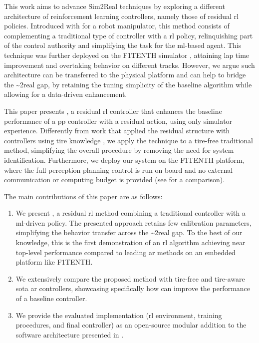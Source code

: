 \documentclass[letterpaper, conference]{IEEEtran}
\begin{document}
This work aims to advance Sim2Real techniques by exploring a different architecture of reinforcement learning controllers, namely those of residual \gls{rl} policies. Introduced with \cite{joahnnink2019residual} for a robot manipulator, this method consists of complementing a traditional type of controller with a \gls{rl} policy, relinquishing part of the control authority and simplifying the task for the \gls{ml}-based agent. This technique was further deployed on the F1TENTH simulator  \cite{trumpp2023residual, trumpp2024racemop}, attaining lap time improvement and overtaking behavior on different tracks.
However, we argue such architecture can be transferred to the physical platform and can help to bridge the \sim2real gap, by retaining the tuning simplicity of the baseline algorithm while allowing for a data-driven enhancement.

This paper presents {\namealgo}, a residual \gls{rl} controller that enhances the baseline performance of a \gls{pp} controller with a residual action, using only simulator experience. Differently from work that applied the residual structure with controllers using tire knowledge \cite{bang2024rlaugmentedmpcframeworkagile}, we apply the technique to a tire-free traditional method, simplifying the overall procedure by removing the need for system identification.
Furthermore, we deploy our system on the F1TENTH platform, where the full perception-planning-control is run on board and no external communication or computing budget is provided (see  for a comparison).

The main contributions of this paper are as follows:
\begin{enumerate}[I]
    \item 
    We present {\namealgo}, a residual \gls{rl} method combining a traditional controller with a \gls{ml}-driven policy. The presented approach retains few calibration parameters, simplifying the behavior transfer across the \sim2real gap. 
    To the best of our knowledge, this is the first demonstration of an \gls{rl} algorithm achieving near top-level performance compared to leading \gls{ar} methods on an embedded platform like F1TENTH.
    \item We extensively compare the proposed method with tire-free and tire-aware \gls{sota} \gls{ar} controllers, showcasing specifically how {\namealgo} can improve the performance of a baseline controller.
    \item We provide the evaluated implementation (\gls{rl} environment, training procedures, and final controller) as an open-source modular addition to the software architecture presented in \cite{forzaeth}.
\end{enumerate}
\end{document}
